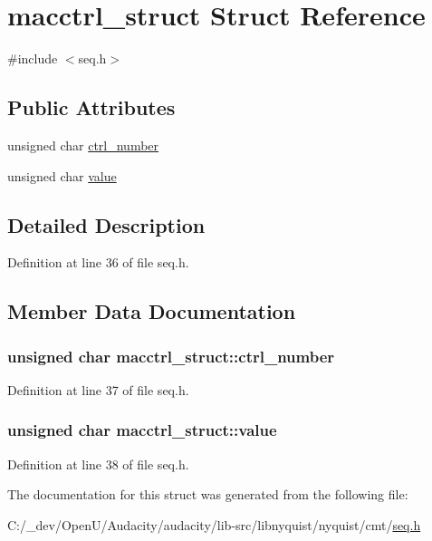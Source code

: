 \hypertarget{structmacctrl__struct}{}\section{macctrl\+\_\+struct Struct Reference}
\label{structmacctrl__struct}


{\ttfamily \#include $<$seq.\+h$>$}

\subsection*{Public Attributes}
\begin{DoxyCompactItemize}
\item 
unsigned char \hyperlink{structmacctrl__struct_ae4b92bc213bc02582531f8a654bc2b20}{ctrl\+\_\+number}
\item 
unsigned char \hyperlink{structmacctrl__struct_a3b5198104e1880835d43ae50ac031ed1}{value}
\end{DoxyCompactItemize}


\subsection{Detailed Description}


Definition at line 36 of file seq.\+h.



\subsection{Member Data Documentation}
\subsubsection[{\texorpdfstring{ctrl\+\_\+number}{ctrl_number}}]{\setlength{\rightskip}{0pt plus 5cm}unsigned char macctrl\+\_\+struct\+::ctrl\+\_\+number}\hypertarget{structmacctrl__struct_ae4b92bc213bc02582531f8a654bc2b20}{}\label{structmacctrl__struct_ae4b92bc213bc02582531f8a654bc2b20}


Definition at line 37 of file seq.\+h.

\subsubsection[{\texorpdfstring{value}{value}}]{\setlength{\rightskip}{0pt plus 5cm}unsigned char macctrl\+\_\+struct\+::value}\hypertarget{structmacctrl__struct_a3b5198104e1880835d43ae50ac031ed1}{}\label{structmacctrl__struct_a3b5198104e1880835d43ae50ac031ed1}


Definition at line 38 of file seq.\+h.



The documentation for this struct was generated from the following file\+:\begin{DoxyCompactItemize}
\item 
C\+:/\+\_\+dev/\+Open\+U/\+Audacity/audacity/lib-\/src/libnyquist/nyquist/cmt/\hyperlink{seq_8h}{seq.\+h}\end{DoxyCompactItemize}
